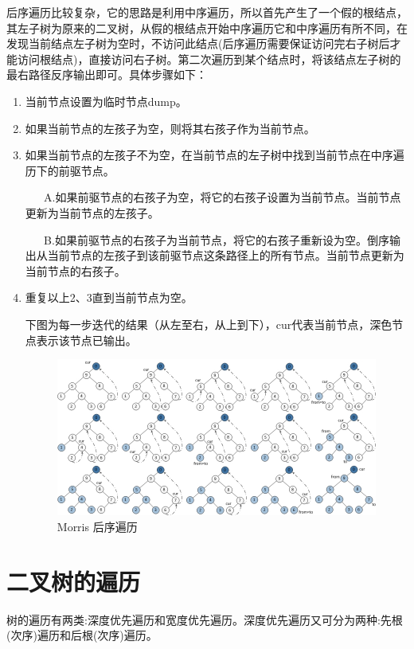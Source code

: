 \documentclass[12pt]{book}
\begin{document}
后序遍历比较复杂，它的思路是利用中序遍历，所以首先产生了一个假的根结点，其左子树为原来的二叉树，从假的根结点开始中序遍历它和中序遍历有所不同，在发现当前结点左子树为空时，不访问此结点(后序遍历需要保证访问完右子树后才能访问根结点)，直接访问右子树。第二次遍历到某个结点时，将该结点左子树的最右路径反序输出即可。具体步骤如下：

\begin{enumerate}
\item 当前节点设置为临时节点dump。
\label{sec-4-1-3-1}
\item 如果当前节点的左孩子为空，则将其右孩子作为当前节点。
\label{sec-4-1-3-2}
\item 如果当前节点的左孩子不为空，在当前节点的左子树中找到当前节点在中序遍历下的前驱节点。
\label{sec-4-1-3-3}

~ ~ A.如果前驱节点的右孩子为空，将它的右孩子设置为当前节点。当前节点更新为当前节点的左孩子。

~ ~ B.如果前驱节点的右孩子为当前节点，将它的右孩子重新设为空。倒序输出从当前节点的左孩子到该前驱节点这条路径上的所有节点。当前节点更新为当前节点的右孩子。

\item 重复以上2、3直到当前节点为空。
\label{sec-4-1-3-4}

下图为每一步迭代的结果（从左至右，从上到下），cur代表当前节点，深色节点表示该节点已输出。

\begin{figure}[htb]
\centering
\includegraphics[width=.9\linewidth]{./pic/morrPost.jpg}
\caption{Morris 后序遍历}
\end{figure}
\end{enumerate}

\section{二叉树的遍历}
\label{sec-4-2}

树的遍历有两类:深度优先遍历和宽度优先遍历。深度优先遍历又可分为两种:先根(次序)遍历和后根(次序)遍历。
\end{document}
